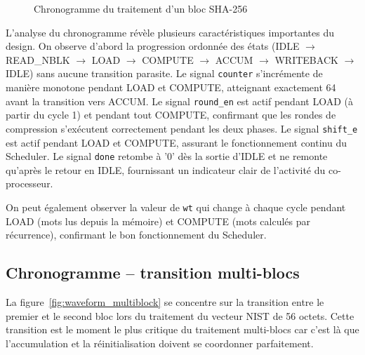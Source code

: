\begin{figure}[H]
\centering
%
\caption{Chronogramme du traitement d'un bloc SHA-256}
\label{fig:waveform_1block}
\end{figure}

L'analyse du chronogramme révèle plusieurs caractéristiques importantes du design. On observe d'abord la progression ordonnée des états (IDLE $\rightarrow$ READ\_NBLK $\rightarrow$ LOAD $\rightarrow$ COMPUTE $\rightarrow$ ACCUM $\rightarrow$ WRITEBACK $\rightarrow$ IDLE) sans aucune transition parasite. Le signal \texttt{counter} s'incrémente de manière monotone pendant LOAD et COMPUTE, atteignant exactement 64 avant la transition vers ACCUM. Le signal \texttt{round\_en} est actif pendant LOAD (à partir du cycle 1) et pendant tout COMPUTE, confirmant que les rondes de compression s'exécutent correctement pendant les deux phases. Le signal \texttt{shift\_e} est actif pendant LOAD et COMPUTE, assurant le fonctionnement continu du Scheduler. Le signal \texttt{done} retombe à '0' dès la sortie d'IDLE et ne remonte qu'après le retour en IDLE, fournissant un indicateur clair de l'activité du co-processeur.

On peut également observer la valeur de \texttt{wt} qui change à chaque cycle pendant LOAD (mots lus depuis la mémoire) et COMPUTE (mots calculés par récurrence), confirmant le bon fonctionnement du Scheduler.

\subsection{Chronogramme -- transition multi-blocs}

La figure~\ref{fig:waveform_multiblock} se concentre sur la transition entre le premier et le second bloc lors du traitement du vecteur NIST de 56 octets. Cette transition est le moment le plus critique du traitement multi-blocs car c'est là que l'accumulation et la réinitialisation doivent se coordonner parfaitement.

